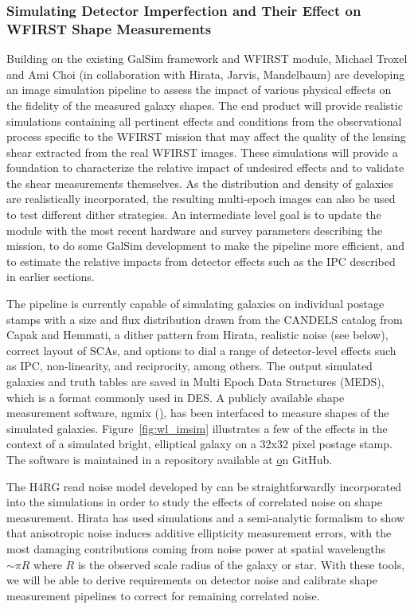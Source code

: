 \subsubsection{Simulating Detector Imperfection and Their Effect on WFIRST Shape Measurements}
\label{sec:hlis_image_sim}
Building on the existing GalSim framework and WFIRST module, Michael Troxel and Ami Choi (in collaboration with Hirata, Jarvis, Mandelbaum) are developing an image
simulation pipeline to assess the impact of various physical effects on the fidelity of the measured galaxy shapes.  The end product will provide realistic simulations containing all pertinent effects and conditions from the observational process specific to the WFIRST mission that may affect the quality of the lensing shear extracted
from the real WFIRST images.  These simulations will provide a foundation to characterize the relative impact of undesired effects and to validate the shear measurements themselves.  As the distribution and density of galaxies are realistically incorporated, the resulting multi-epoch images can also be used to test different dither strategies.  An intermediate level goal is to update the module with the most recent hardware and survey parameters describing the mission, to do some GalSim development to make the pipeline more efficient, and to estimate the relative impacts from detector effects such as the IPC described in earlier sections.

The pipeline is currently capable of simulating galaxies on individual postage stamps with a size and flux distribution drawn from the CANDELS catalog from Capak and Hemmati, a dither pattern from Hirata, realistic noise (see below), correct layout of SCAs, and options to dial a range of detector-level effects such as IPC, non-linearity, and reciprocity, among others.  The output simulated galaxies and truth tables are saved in Multi Epoch Data Structures (MEDS), which is a format commonly used in DES.  A publicly available shape measurement software, ngmix (\href{https://github.com/esheldon/ngmix/}), has been interfaced to measure shapes of the simulated galaxies.  Figure~\ref{fig:wl_imsim} illustrates a few of the effects in the context of a simulated bright, elliptical galaxy on a 32x32 pixel postage stamp.  The software is maintained in a repository available at \href{https://github.com/matroxel/wfirst_imsim} on GitHub.

The H4RG read noise model developed by \cite{Rauscher2015} can be straightforwardly incorporated into the simulations in order to study the effects of correlated noise on shape measurement.  Hirata has used simulations and a semi-analytic formalism to show that anisotropic noise induces additive ellipticity measurement errors, with the most damaging contributions coming from noise power at spatial wavelengths $\sim\pi R$ where $R$ is the observed scale radius of the galaxy or star.  With these tools, we will be able to derive requirements on detector noise and calibrate shape measurement pipelines to correct for remaining correlated noise.

